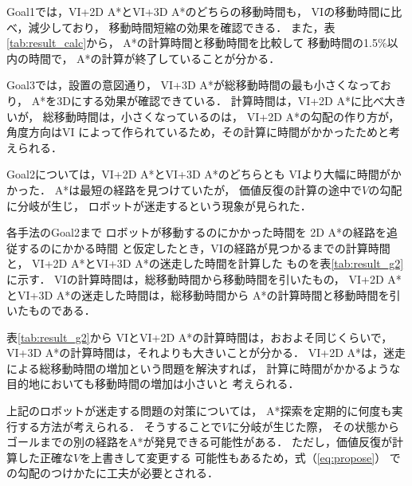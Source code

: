 Goal1では，VI+2D A*とVI+3D A*のどちらの移動時間も，
VIの移動時間に比べ，減少しており，
移動時間短縮の効果を確認できる．
また，表\ref{tab:result_calc}から，
A*の計算時間と移動時間を比較して
移動時間の1.5\%以内の時間で，
A*の計算が終了していることが分かる．

Goal3では，設置の意図通り，
VI+3D A*が総移動時間の最も小さくなっており，
A*を3Dにする効果が確認できている．
計算時間は，VI+2D A*に比べ大きいが，
総移動時間は，小さくなっているのは，
VI+2D A*の勾配の作り方が，角度方向はVI
によって作られているため，その計算に時間がかかったためと考えられる．

Goal2については，VI+2D A*とVI+3D A*のどちらとも
VIより大幅に時間がかかった．
A*は最短の経路を見つけていたが，
価値反復の計算の途中で$V$の勾配に分岐が生じ，
ロボットが迷走するという現象が見られた．

各手法のGoal2まで
ロボットが移動するのにかかった時間を
2D A*の経路を追従するのにかかる時間
と仮定したとき，VIの経路が見つかるまでの計算時間と，
VI+2D A*とVI+3D A*の迷走した時間を計算した
ものを表\ref{tab:result_g2}に示す．
VIの計算時間は，総移動時間から移動時間を引いたもの，
VI+2D A*とVI+3D A*の迷走した時間は，総移動時間から
A*の計算時間と移動時間を引いたものである．

表\ref{tab:result_g2}から
VIとVI+2D A*の計算時間は，おおよそ同じくらいで，
VI+3D A*の計算時間は，それよりも大きいことが分かる．
VI+2D A*は，迷走による総移動時間の増加という問題を解決すれば，
計算に時間がかかるような目的地においても移動時間の増加は小さいと
考えられる．


上記のロボットが迷走する問題の対策については，
A*探索を定期的に何度も実行する方法が考えられる．
そうすることで$V$に分岐が生じた際，
その状態からゴールまでの別の経路をA*が発見できる可能性がある．
ただし，価値反復が計算した正確な$V$を上書きして変更する
可能性もあるため，式（\ref{eq:propose}）
での勾配のつけかたに工夫が必要とされる．



